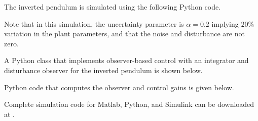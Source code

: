 The inverted pendulum is simulated using the following Python code.

Note that in this simulation, the uncertainty parameter is $\alpha=0.2$ implying $20\%$ variation in the plant parameters, and that the noise and disturbance are not zero.

A Python class that implements observer-based control with an integrator and disturbance observer for the inverted pendulum is shown below.


Python code that computes the observer and control gains is given below.


Complete simulation code for Matlab, Python, and Simulink can be downloaded at .
